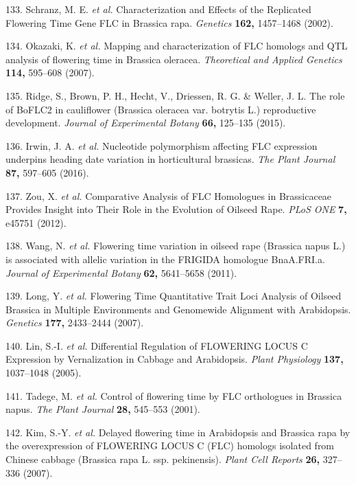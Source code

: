 \documentclass[12pt,]{book}
\begin{document}
\hypertarget{ref-schranz_characterization_2002}{}
133. Schranz, M. E. \emph{et al.} Characterization and Effects of the
Replicated Flowering Time Gene FLC in Brassica rapa. \emph{Genetics}
\textbf{162,} 1457--1468 (2002).

\hypertarget{ref-okazaki_mapping_2007}{}
134. Okazaki, K. \emph{et al.} Mapping and characterization of FLC
homologs and QTL analysis of flowering time in Brassica oleracea.
\emph{Theoretical and Applied Genetics} \textbf{114,} 595--608 (2007).

\hypertarget{ref-ridge_role_2015}{}
135. Ridge, S., Brown, P. H., Hecht, V., Driessen, R. G. \& Weller, J.
L. The role of BoFLC2 in cauliflower (Brassica oleracea var. botrytis
L.) reproductive development. \emph{Journal of Experimental Botany}
\textbf{66,} 125--135 (2015).

\hypertarget{ref-irwin_nucleotide_2016}{}
136. Irwin, J. A. \emph{et al.} Nucleotide polymorphism affecting FLC
expression underpins heading date variation in horticultural brassicas.
\emph{The Plant Journal} \textbf{87,} 597--605 (2016).

\hypertarget{ref-zou_comparative_2012}{}
137. Zou, X. \emph{et al.} Comparative Analysis of FLC Homologues in
Brassicaceae Provides Insight into Their Role in the Evolution of
Oilseed Rape. \emph{PLoS ONE} \textbf{7,} e45751 (2012).

\hypertarget{ref-wang_flowering_2011}{}
138. Wang, N. \emph{et al.} Flowering time variation in oilseed rape
(Brassica napus L.) is associated with allelic variation in the FRIGIDA
homologue BnaA.FRI.a. \emph{Journal of Experimental Botany} \textbf{62,}
5641--5658 (2011).

\hypertarget{ref-long_flowering_2007}{}
139. Long, Y. \emph{et al.} Flowering Time Quantitative Trait Loci
Analysis of Oilseed Brassica in Multiple Environments and Genomewide
Alignment with Arabidopsis. \emph{Genetics} \textbf{177,} 2433--2444
(2007).

\hypertarget{ref-lin_differential_2005}{}
140. Lin, S.-I. \emph{et al.} Differential Regulation of FLOWERING LOCUS
C Expression by Vernalization in Cabbage and Arabidopsis. \emph{Plant
Physiology} \textbf{137,} 1037--1048 (2005).

\hypertarget{ref-tadege_control_2001}{}
141. Tadege, M. \emph{et al.} Control of flowering time by FLC
orthologues in Brassica napus. \emph{The Plant Journal} \textbf{28,}
545--553 (2001).

\hypertarget{ref-kim_delayed_2007}{}
142. Kim, S.-Y. \emph{et al.} Delayed flowering time in Arabidopsis and
Brassica rapa by the overexpression of FLOWERING LOCUS C (FLC) homologs
isolated from Chinese cabbage (Brassica rapa L. ssp. pekinensis).
\emph{Plant Cell Reports} \textbf{26,} 327--336 (2007).
\end{document}

